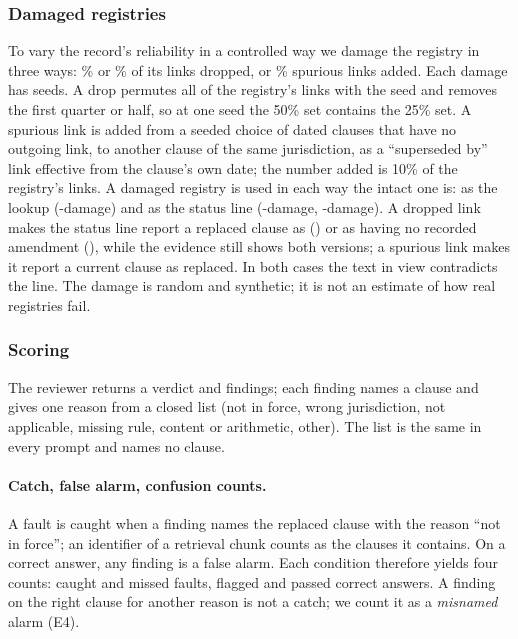 \subsubsection{Damaged registries}
\label{sec:damage}
To vary the record's reliability in a controlled way we damage the registry in three ways: \DamageDropTwentyFive\% or
\DamageDropFifty\% of its links dropped, or \DamageSpuriousTen\% spurious links added. Each damage has \NDamageSeeds{}
seeds. A drop permutes all of the registry's links with the seed and removes the first quarter or half, so at one seed
the 50\% set contains the 25\% set. A spurious link is added from a seeded choice of dated clauses that have no
outgoing link, to another clause of the same jurisdiction, as a ``superseded by'' link effective from the clause's own
date; the number added is 10\% of the registry's links. A damaged registry is used in each way the intact one is: as the lookup
(-damage) and as the status line (-damage, -damage). A dropped link makes the status line
report a replaced clause as  () or as having no recorded amendment (), while the evidence
still shows both versions; a spurious link makes it report a current clause as replaced. In both cases the text in view
contradicts the line. The damage is random and synthetic; it is not an estimate of how real registries fail.

\subsubsection{Scoring}
\label{sec:scoring}
The reviewer returns a verdict and findings; each finding names a clause and gives one reason from a closed list (not in
force, wrong jurisdiction, not applicable, missing rule, content or arithmetic, other). The list is the same in every
prompt and names no clause.

\paragraph{Catch, false alarm, confusion counts.}
A fault is caught when a finding names the replaced clause with the reason ``not in force''; an identifier of a
retrieval chunk counts as the clauses it contains. On a correct answer, any finding is a false alarm. Each condition
therefore yields four counts: caught and missed faults, flagged and passed correct answers. A finding on the right clause
for another reason is not a catch; we count it as a \emph{misnamed} alarm (E4).

